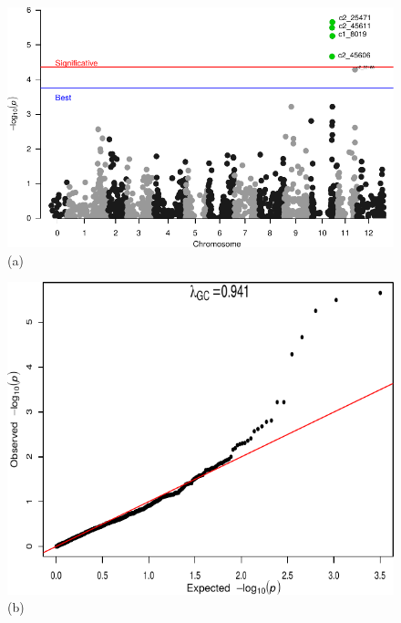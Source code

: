 \documentclass{article}
\begin{document}
\begin{figure}[H]
\noindent %
\noindent\begin{minipage}[t]{1\columnwidth}%
\begin{minipage}[t][1\totalheight][c]{0.5\columnwidth}%
\begin{center}
\includegraphics[scale=0.5]{images/out-multiGWAS-views-manhattan-GWASpoly}\\
(a)
\par\end{center}%
\end{minipage}%
\begin{minipage}[t][1\totalheight][c]{0.5\columnwidth}%
\begin{center}
\includegraphics[bb=-30bp 0bp 294bp 238bp,clip,scale=0.5]{images/out-multiGWAS-views-QQ-GWASpoly}\\
(b)
\par\end{center}%
\end{minipage}%
\end{minipage}


\end{figure}
\end{document}
